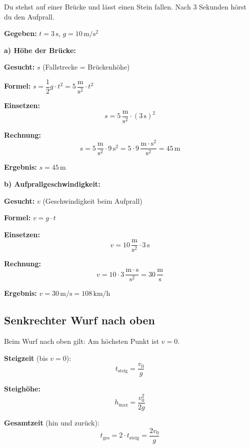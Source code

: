 \documentclass[11pt,a4paper]{article}
\begin{document}
\begin{beispiel}
Du stehst auf einer Brücke und lässt einen Stein fallen. Nach 3 Sekunden hörst du den Aufprall.

\textbf{Gegeben:} $t = 3\,\mathrm{s}$, \quad $g = 10\,\mathrm{m/s^2}$

\vspace{0.3cm}
\textbf{a) Höhe der Brücke:}

\textbf{Gesucht:} $s$ (Fallstrecke = Brückenhöhe)

\textbf{Formel:} $s = \dfrac{1}{2} g \cdot t^2 = 5\,\dfrac{\mathrm{m}}{\mathrm{s}^2} \cdot t^2$

\textbf{Einsetzen:}
\[
s = 5\,\frac{\mathrm{m}}{\mathrm{s}^2} \cdot (3\,\mathrm{s})^2
\]

\textbf{Rechnung:}
\[
s = 5\,\frac{\mathrm{m}}{\mathrm{s}^2} \cdot 9\,\mathrm{s}^2 = 5 \cdot 9\,\frac{\mathrm{m} \cdot \mathrm{s}^2}{\mathrm{s}^2} = 45\,\mathrm{m}
\]

\textbf{Ergebnis:} $\boxed{s = 45\,\mathrm{m}}$

\vspace{0.3cm}
\textbf{b) Aufprallgeschwindigkeit:}

\textbf{Gesucht:} $v$ (Geschwindigkeit beim Aufprall)

\textbf{Formel:} $v = g \cdot t$

\textbf{Einsetzen:}
\[
v = 10\,\frac{\mathrm{m}}{\mathrm{s}^2} \cdot 3\,\mathrm{s}
\]

\textbf{Rechnung:}
\[
v = 10 \cdot 3\,\frac{\mathrm{m} \cdot \mathrm{s}}{\mathrm{s}^2} = 30\,\frac{\mathrm{m}}{\mathrm{s}}
\]

\textbf{Ergebnis:} $\boxed{v = 30\,\mathrm{m/s} = 108\,\mathrm{km/h}}$
\end{beispiel}

\subsection{Senkrechter Wurf nach oben}

Beim Wurf nach oben gilt: Am höchsten Punkt ist $v = 0$.

\begin{formelbox}
\textbf{Steigzeit} (bis $v = 0$):
\[
t_{\text{steig}} = \frac{v_0}{g}
\]

\textbf{Steighöhe:}
\[
h_{\text{max}} = \frac{v_0^2}{2g}
\]

\textbf{Gesamtzeit} (hin und zurück):
\[
t_{\text{ges}} = 2 \cdot t_{\text{steig}} = \frac{2v_0}{g}
\]
\end{formelbox}
\end{document}
